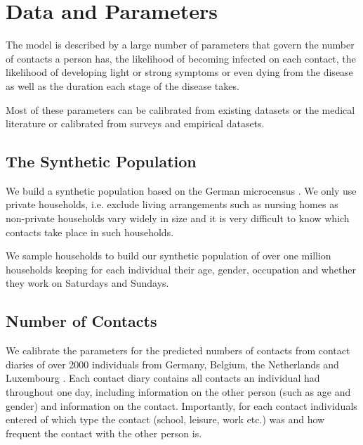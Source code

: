 \section{Data and Parameters}
\label{sec:data_and_parameters}

The model is described by a large number of parameters that govern the number of
contacts a person has, the likelihood of becoming infected on each contact, the
likelihood of developing light or strong symptoms or even dying from the disease as well
as the duration each stage of the disease takes.

Most of these parameters can be calibrated from existing datasets or the medical
literature or calibrated from surveys and empirical datasets.



\FloatBarrier

\subsection{The Synthetic Population }

We build a synthetic population based on the German microcensus \citep{FDSAeDBUDL2018}.
We only use private households, i.e. exclude living arrangements such as nursing homes as
non-private households vary widely in size and it is very difficult to know which
contacts take place in such households.

We sample households to build our synthetic population of over one million households
keeping for each individual their age, gender, occupation and whether they work on
Saturdays and Sundays.

\FloatBarrier


\subsection{Number of Contacts}
\label{sub:number_of_contacts}

We calibrate the parameters for the predicted numbers of contacts from contact diaries
of over 2000 individuals from Germany, Belgium, the Netherlands and Luxembourg
\citep{Mossong2008}. Each contact diary contains all contacts an individual had
throughout one day, including information on the other person (such as age and gender)
and information on the contact. Importantly, for each contact individuals entered of
which type the contact (school, leisure, work etc.) was and how frequent the contact
with the other person is.

